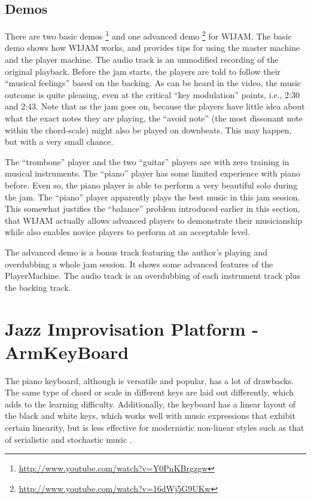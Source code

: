\subsection{Demos}
There are two basic demos \footnote{\url{http://www.youtube.com/watch?v=Y0PnKBrgzgw}} and one advanced demo \footnote{\url{http://www.youtube.com/watch?v=16dWj5G9UKw}} for WIJAM. The basic demo shows how WIJAM works, and provides tips for using the master machine and the player machine. The audio track is an unmodified recording of the original playback. Before the jam starts, the players are told to follow their ``musical feelings'' based on the backing. As can be heard in the video, the music outcome is quite pleasing, even at the critical ``key modulation'' points, i.e., 2:30 and 2:43. Note that as the jam goes on, because the players have little idea about what the exact notes they are playing, the ``avoid note'' (the most dissonant note within the chord-scale) might also be played on downbeats. This may happen, but with a very small chance.

The ``trombone'' player and the two ``guitar'' players are with zero training in musical instruments. The ``piano'' player has some limited
experience with piano before. Even so, the piano player is able to perform a very beautiful solo during the jam. The ``piano'' player apparently plays the best music in this jam session. This somewhat justifies the ``balance'' problem introduced earlier in this section, that WIJAM actually allows advanced players to demonstrate their musicianship while also enables novice players to perform at an acceptable level.

The advanced demo is a bonus track featuring the author's playing and overdubbing a whole jam session. It shows some advanced features of the PlayerMachine. The audio track is an overdubbing of each instrument track plus the backing track.

\section{Jazz Improvisation Platform - ArmKeyBoard} \label{sec:5-akb}
The piano keyboard, although is versatile and popular, has a lot of drawbacks. The same type of chord or scale in different keys are laid out differently, which adds to the learning difficulty. Additionally, the keyboard has a linear layout of the black and white keys, which works well with music expressions that exhibit certain linearity, but is less effective for modernistic non-linear styles such as that of serialistic and stochastic music \cite{Mitsuko:Schoenberg}.

